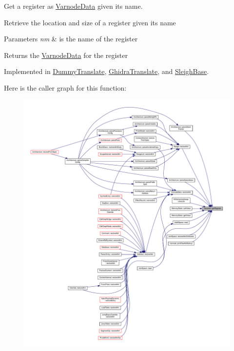 Get a register as \mbox{\hyperlink{struct_varnode_data}{Varnode\+Data}} given its name. 

Retrieve the location and size of a register given its name 
\begin{DoxyParams}{Parameters}
{\em nm} & is the name of the register \\
\hline
\end{DoxyParams}
\begin{DoxyReturn}{Returns}
the \mbox{\hyperlink{struct_varnode_data}{Varnode\+Data}} for the register 
\end{DoxyReturn}


Implemented in \mbox{\hyperlink{class_dummy_translate_a4c030a80bc088c90ffff5b7a0a78434d}{Dummy\+Translate}}, \mbox{\hyperlink{class_ghidra_translate_a81e1af3292005903279e80a61a6ccfac}{Ghidra\+Translate}}, and \mbox{\hyperlink{class_sleigh_base_ad347067ddd9469322e79b97a19386f82}{Sleigh\+Base}}.

Here is the caller graph for this function\+:
\nopagebreak
\begin{figure}[H]
\begin{center}
\leavevmode
\includegraphics[width=350pt]{class_translate_a3a62c460db4eccc285fa3dd29dd4a29b_icgraph}
\end{center}
\end{figure}
\mbox{\label{class_translate_a1da0ef001f801641313d9168fb359f02}} 
